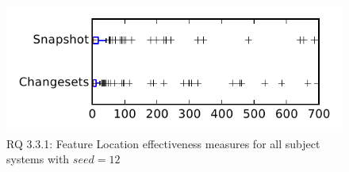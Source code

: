 
\begin{figure}
\centering
\includegraphics[height=0.4\textheight]{figures/flt_seed/rq1_tiny_12}
\caption{RQ 3.3.1: Feature Location effectiveness measures for all subject systems with $seed=12$}
\label{fig:flt_seed:rq1:tiny}
\end{figure}
